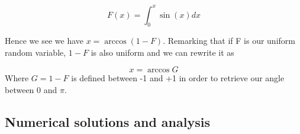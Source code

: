 \documentclass[10 pt]{article}
\numberwithin{equation}{section}
\begin{document}
\begin{multicols}{2}
\begin{equation}
F(x) = \int _0 ^x \sin (x) dx
\end{equation}

Hence we see we have $x = \arccos (1 - F)$. Remarking that if F is our uniform random variable, $1-F$ is also uniform and we can rewrite it as

\begin{equation}
x = \arccos G
\end{equation}
Where $G = 1 -F$ is defined between -1 and +1 in order to retrieve our angle between 0 and $\pi$.

\subsection{Numerical solutions and analysis}


\end{multicols}
\end{document}
